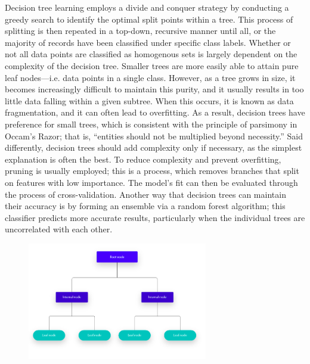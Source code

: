 \documentclass[a4paper]{article}
\theoremstyle{plain}
\theoremstyle{definition}
\begin{document}
Decision tree learning employs a divide and conquer strategy by conducting a greedy search to identify the optimal split points within a tree. This process of splitting is then repeated in a top-down, recursive manner until all, or the majority of records have been classified under specific class labels. Whether or not all data points are classified as homogenous sets is largely dependent on the complexity of the decision tree. Smaller trees are more easily able to attain pure leaf nodes—i.e. data points in a single class. However, as a tree grows in size, it becomes increasingly difficult to maintain this purity, and it usually results in too little data falling within a given subtree. When this occurs, it is known as data fragmentation, and it can often lead to overfitting. As a result, decision trees have preference for small trees, which is consistent with the principle of parsimony in Occam’s Razor; that is, “entities should not be multiplied beyond necessity.” Said differently, decision trees should add complexity only if necessary, as the simplest explanation is often the best. To reduce complexity and prevent overfitting, pruning is usually employed; this is a process, which removes branches that split on features with low importance. The model’s fit can then be evaluated through the process of cross-validation. Another way that decision trees can maintain their accuracy is by forming an ensemble via a random forest algorithm; this classifier predicts more accurate results, particularly when the individual trees are uncorrelated with each other.\newline

\begin{figure}[htbp] %
    \includegraphics[width=0.7\textwidth]{figs/decisiontree.png} %
    \label{fig:example}
\end{figure}\newline
\end{document}
